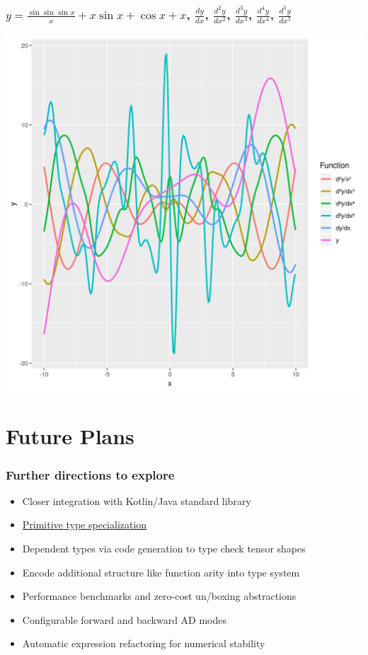 \documentclass{beamer}
\begin{document}
    \begin{frame}
        \frametitle{$y = \frac{\sin{\sin{\sin{x}}}}{x} + x \sin{x} + \cos{x} + x$, $\frac{dy}{dx}$, $\frac{d^{2}y}{dx^2}$, $\frac{d^{3}y}{dx^3}$, $\frac{d^{4}y}{dx^4}$, $\frac{d^{5}y}{dx^5}$}
        \begin{center}
            \includegraphics[scale=0.4]{plot.png}
        \end{center}
    \end{frame}

    \section{Future Plans}\label{sec:fifth-section}

    \begin{frame}
        \frametitle{Further directions to explore}
        \begin{itemize}
            \item Closer integration with Kotlin/Java standard library
            \item \href{https://discuss.kotlinlang.org/t/primitive-type-specialization/11022/4}{Primitive type specialization}
            \item Dependent types via code generation to type check tensor shapes
            \item Encode additional structure like function arity into type system
            \item Performance benchmarks and zero-cost un/boxing abstractions
            \item Configurable forward and backward AD modes
            \item Automatic expression refactoring for numerical stability
        \end{itemize}
    \end{frame}
\end{document}

